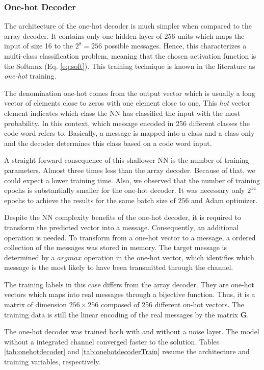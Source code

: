 \documentclass[conference]{IEEEtran}
\begin{document}
\subsubsection{One-hot Decoder}

The architecture of the one-hot decoder is much simpler when compared to the array decoder. It contains only one hidden layer of $256$ units which maps the input of size 16 to the $2^8=256$ possible messages. Hence, this characterizes a multi-class classification problem, meaning that the chosen activation function is the Softmax (Eq. \ref{eq:soft}). This training technique is known in the literature as \textit{one-hot} training. 

The denomination one-hot comes from the output vector which is usually a long vector of elements close to zeros with one element close to one. This \textit{hot} vector element indicates which class the NN has classified the input with the most probability. In this context, which message encoded in 256 different classes the code word refers to. Basically, a message is mapped into a class and a class only and the decoder determines this class based on a code word input.

A straight forward consequence of this shallower NN is the number of training parameters. Almost three times less than the array decoder. Because of that, we could expect a lower training time. Also, we observed that the number of training epochs is substantially smaller for the one-hot decoder. It was necessary only $2^{14}$ epochs to achieve the results for the same batch size of $256$ and Adam optimizer.

Despite the NN complexity benefits of the one-hot decoder, it is required to transform the predicted vector into a message. Consequently, an additional operation is needed. To transform from a one-hot vector to a message, a ordered collection of the messages was stored in memory. The target message is determined by a $argmax$ operation in the one-hot vector, which identifies which message is the most likely to have been transmitted through the channel.

The training labels in this case differs from the array decoder. They are one-hot vectors which maps into real messages through a bijective function. Thus, it is a matrix of dimension $256\times256$ composed of 256 different on-hot vectors. The training data is still the linear encoding of the real messages by the matrix $\textbf{G}$. 

The one-hot decoder was trained both with and without a noise layer. The model without a integrated channel converged faster to the solution. Tables \ref{tab:onehotdecoder} and \ref{tab:onehotdecoderTrain} resume the architecture and training variables, respectively.
\end{document}
